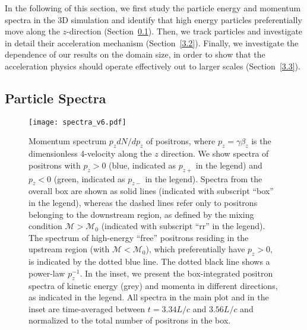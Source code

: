 \documentclass[twocolumn,twocolappendix]{aastex63}
\begin{document}
In the following of this section, we first study the particle energy and momentum spectra in the 3D simulation and identify that %
high energy particles preferentially move along the $z$-direction (Section~\ref{3.1}). Then, we track particles and investigate in detail their acceleration mechanism (Section~\ref{3.2}). Finally, we investigate the dependence of our results on the domain size, in order to show that the acceleration physics should operate effectively out to larger scales (Section~\ref{3.3}).

\subsection{Particle Spectra}\label{3.1}

\begin{figure}
    \texttt{[image: spectra\_v6.pdf]}
    \caption{Momentum spectrum $p_z dN/dp_z$ of positrons, where $p_z=\gamma \beta_z$ is the dimensionless 4-velocity along the $z$ direction.  We show spectra of positrons with $p_z>0$ (blue, indicated as $p_{z+}$ in the legend) and $p_z<0$ (green, indicated as $p_{z-}$ in the legend). Spectra from the overall box are shown as solid lines (indicated with subscript ``box'' in the legend), whereas the dashed lines refer only to positrons belonging to the downstream region, as defined by the mixing condition $\mathcal{M}>\mathcal{M}_0$ (indicated with subscript ``rr'' in the legend). The spectrum of high-energy ``free'' positrons residing in the upstream region (with $\mathcal{M}<\mathcal{M}_0$), which preferentially have $p_z>0$, is indicated by the dotted blue line. The dotted black line shows a power-law $p_z^{-1}$. In the inset, we present the box-integrated positron spectra of kinetic energy (grey) and momenta in different directions, as indicated in the legend. All spectra in the main plot and in the inset are time-averaged between $t = 3.34L/c$ and $3.56L/c$ and normalized to the total number of positrons in the box.
    }
    \label{fig:spectra}
\end{figure}
\end{document}
